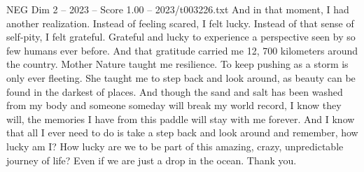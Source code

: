 \begin{textsample}{NEG Dim 2 – 2023 – Score 1.00 – 2023/t003226.txt}
And in that moment, I had another realization.
Instead of feeling scared, I felt lucky.
Instead of that sense of self-pity, I felt grateful.
Grateful and lucky to experience a perspective seen by so few humans ever before.
And that gratitude carried me 12, 700 kilometers around the country.
Mother Nature taught me resilience.
To keep pushing as a storm is only ever fleeting.
She taught me to step back and look around, as beauty can be found in the darkest of places.
And though the sand and salt has been washed from my body and someone someday will break my world record, I know they will, the memories I have from this paddle will stay with me forever.
And I know that all I ever need to do is take a step back and look around and remember, how lucky am I?
How lucky are we to be part of this amazing, crazy, unpredictable journey of life?
Even if we are just a drop in the ocean.
Thank you.

\end{textsample}
